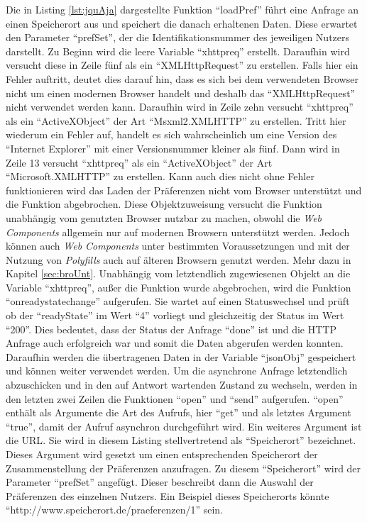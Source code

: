\documentclass[12pt, paper=a4, bibtotoc, toc=listof, headsepline=true]{scrreprt}
\begin{document}
Die in Listing \ref{lst:jquAja} dargestellte Funktion \enquote{loadPref} führt eine Anfrage an einen Speicherort aus und speichert die danach erhaltenen Daten. Diese erwartet den Parameter \enquote{prefSet}, der die Identifikationsnummer des jeweiligen Nutzers darstellt. Zu Beginn wird die leere Variable \enquote{xhttpreq} erstellt. Daraufhin wird versucht diese in Zeile fünf als ein \enquote{XMLHttpRequest} zu erstellen. Falls hier ein Fehler auftritt, deutet dies darauf hin, dass es sich bei dem verwendeten Browser nicht um einen modernen Browser handelt und deshalb das \enquote{XMLHttpRequest} nicht verwendet werden kann. Daraufhin wird in Zeile zehn versucht \enquote{xhttpreq} als ein \enquote{ActiveXObject} der Art \enquote{Msxml2.XMLHTTP} zu erstellen. Tritt hier wiederum ein Fehler auf, handelt es sich wahrscheinlich um eine Version des \enquote{Internet Explorer} mit einer Versionsnummer kleiner als fünf. Dann wird in Zeile 13 versucht \enquote{xhttpreq} als ein \enquote{ActiveXObject} der Art \enquote{Microsoft.XMLHTTP} zu erstellen. Kann auch dies nicht ohne Fehler funktionieren wird das Laden der Präferenzen nicht vom Browser unterstützt und die Funktion abgebrochen. Diese Objektzuweisung versucht die Funktion unabhängig vom genutzten Browser nutzbar zu machen, obwohl die \emph{Web Components} allgemein nur auf modernen Browsern unterstützt werden. Jedoch können auch \emph{Web Components} unter bestimmten Voraussetzungen und mit der Nutzung von \emph{Polyfills} auch auf älteren Browsern genutzt werden. Mehr dazu in Kapitel \ref{sec:broUnt}. Unabhängig vom letztendlich zugewiesenen Objekt an die Variable \enquote{xhttpreq}, außer die Funktion wurde abgebrochen,  wird die Funktion \enquote{onreadystatechange} aufgerufen. Sie wartet auf einen Statuswechsel und prüft ob der \enquote{readyState} im Wert \enquote{4} vorliegt und gleichzeitig der Status im Wert \enquote{200}. Dies bedeutet, dass der Status der Anfrage \enquote{done} ist und die \ac{HTTP} Anfrage auch erfolgreich war und somit die Daten abgerufen werden konnten. Daraufhin werden die übertragenen Daten in der Variable \enquote{jsonObj} gespeichert und können weiter verwendet werden. Um die asynchrone Anfrage letztendlich abzuschicken und in den auf Antwort wartenden Zustand zu wechseln, werden in den letzten zwei Zeilen die Funktionen \enquote{open} und \enquote{send} aufgerufen. \enquote{open} enthält als Argumente die Art des Aufrufs, hier \enquote{get} und als letztes Argument \enquote{true}, damit der Aufruf asynchron durchgeführt wird. Ein weiteres Argument ist die \ac{URL}. Sie wird in diesem Listing stellvertretend als \enquote{Speicherort} bezeichnet. Dieses Argument wird gesetzt um einen entsprechenden Speicherort der Zusammenstellung der Präferenzen anzufragen. Zu diesem \enquote{Speicherort} wird der Parameter \enquote{prefSet} angefügt. Dieser beschreibt dann die Auswahl der Präferenzen des einzelnen Nutzers. Ein Beispiel dieses
\newline 
Speicherorts könnte \enquote{http://www.speicherort.de/praeferenzen/1} sein\cite{xmlhttp}.
		
\end{document}
